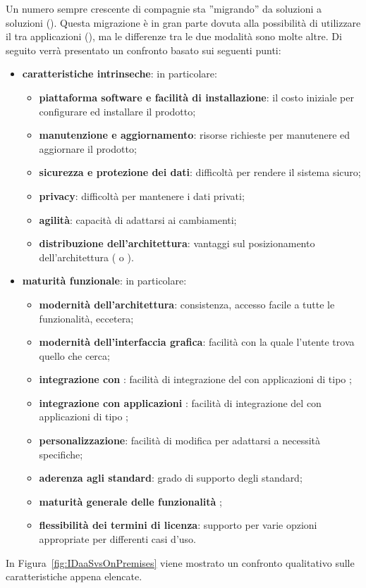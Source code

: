 Un numero sempre crescente di compagnie sta ''migrando'' da soluzioni   a soluzioni  (). Questa migrazione è in gran parte dovuta alla possibilità di utilizzare il  tra applicazioni  (), ma le differenze tra le due modalità sono molte altre. Di seguito verrà presentato un confronto basato sui seguenti punti:
\begin{itemize}
\item \textbf{caratteristiche intrinseche}: in particolare:
	\begin{itemize}
	\item \textbf{piattaforma software e facilità di installazione}: il costo iniziale per configurare ed installare il prodotto;
	\item \textbf{manutenzione e aggiornamento}: risorse richieste per manutenere ed aggiornare il prodotto;
	\item \textbf{sicurezza e protezione dei dati}: difficoltà per rendere il sistema sicuro;
	\item \textbf{privacy}: difficoltà per mantenere i dati privati;
	\item \textbf{agilità}: capacità di adattarsi ai cambiamenti;
	\item \textbf{distribuzione dell'architettura}: vantaggi sul posizionamento dell'architettura ( o ).
	\end{itemize}
\item \textbf{maturità funzionale}: in particolare:
	\begin{itemize}
	\item \textbf{modernità dell'architettura}: consistenza, accesso facile a tutte le funzionalità, eccetera;
	\item \textbf{modernità dell'interfaccia grafica}: facilità con la quale l'utente trova quello che cerca;
	\item \textbf{integrazione con }: facilità di integrazione del  con applicazioni di tipo ;
	\item \textbf{integrazione con applicazioni }: facilità di integrazione del  con applicazioni di tipo ;
	\item \textbf{personalizzazione}: facilità di modifica per adattarsi a necessità specifiche;
	\item \textbf{aderenza agli standard}: grado di supporto degli standard;
	\item \textbf{maturità generale delle funzionalità };
	\item \textbf{flessibilità dei termini di licenza}: supporto per varie opzioni appropriate per differenti casi d'uso. 
	\end{itemize}
\end{itemize}
In Figura~\ref{fig:IDaaSvsOnPremises} viene mostrato un confronto qualitativo sulle caratteristiche appena elencate.

